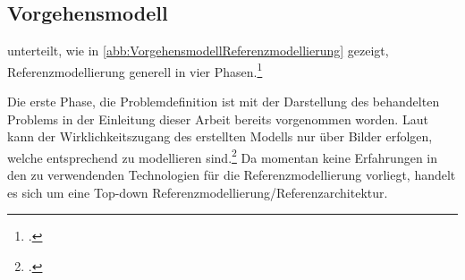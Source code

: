 

\subsection{Vorgehensmodell}\label{subsection:Vorgehensmodel}

\citeauthor{Schutte.1998} unterteilt, wie in \autoref{abb:VorgehensmodellReferenzmodellierung} gezeigt, Referenzmodellierung generell in vier Phasen.\footcite[Vgl. auch im Folgenden][184\psq]{Schutte.1998} 

Die erste Phase, die Problemdefinition ist mit der Darstellung des behandelten Problems in der Einleitung dieser Arbeit bereits vorgenommen worden. Laut \citeauthor{Schutte.1998} kann der Wirklichkeitszugang des erstellten Modells nur über Bilder erfolgen, welche entsprechend zu modellieren sind.\footcite[Vgl. auch im Folgenden][185\psq]{Schutte.1998} Da momentan keine Erfahrungen in den zu verwendenden Technologien für die Referenzmodellierung vorliegt, handelt es sich um eine Top-down Referenzmodellierung/Referenzarchitektur. 

